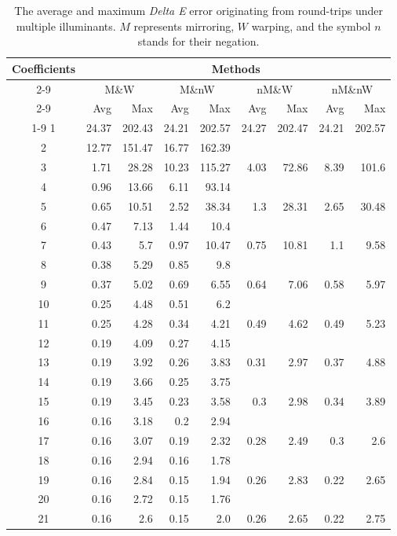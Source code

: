 \begin{table}[t]
	\centering
	\begin{tabular}{crrrrrrrr}
		\toprule
		\multirow{4}{*}{Coefficients} &
		\multicolumn{8}{c}{Methods} \\
		\cmidrule(lr){2-9}
		&\multicolumn{2}{c}{M\&W} &
		\multicolumn{2}{c}{M\&nW} &
		\multicolumn{2}{c}{nM\&W} &
		\multicolumn{2}{c}{nM\&nW}\\
		\cmidrule(lr){2-9}
		& Avg & Max & Avg & Max & Avg & Max & Avg & Max \\
		\cmidrule(lr){1-9}
		1&24.37&202.43&24.21&202.57&24.27&202.47&24.21&202.57\\
		2&12.77&151.47&16.77&162.39&\textemdash&\textemdash&\textemdash&\textemdash\\
		3&1.71&28.28&10.23&115.27&4.03&72.86&8.39&101.6\\
		4&0.96&13.66&6.11&93.14&\textemdash&\textemdash&\textemdash&\textemdash\\
		5&0.65&10.51&2.52&38.34&1.3&28.31&2.65&30.48\\
		6&0.47&7.13&1.44&10.4&\textemdash&\textemdash&\textemdash&\textemdash\\
		7&0.43&5.7&0.97&10.47&0.75&10.81&1.1&9.58\\
		8&0.38&5.29&0.85&9.8&\textemdash&\textemdash&\textemdash&\textemdash\\
		9&0.37&5.02&0.69&6.55&0.64&7.06&0.58&5.97\\ 
		10&0.25&4.48&0.51&6.2&\textemdash&\textemdash&\textemdash&\textemdash\\
		11&0.25&4.28&0.34&4.21&0.49&4.62&0.49&5.23\\
		12&0.19&4.09&0.27&4.15&\textemdash&\textemdash&\textemdash&\textemdash\\
		13&0.19&3.92&0.26&3.83&0.31&2.97&0.37&4.88\\
		14&0.19&3.66&0.25&3.75&\textemdash&\textemdash&\textemdash&\textemdash\\
		15&0.19&3.45&0.23&3.58&0.3&2.98&0.34&3.89\\
		16&0.16&3.18&0.2&2.94&\textemdash&\textemdash&\textemdash&\textemdash\\
		17&0.16&3.07&0.19&2.32&0.28&2.49&0.3&2.6\\
		18&0.16&2.94&0.16&1.78&\textemdash&\textemdash&\textemdash&\textemdash\\
		19&0.16&2.84&0.15&1.94&0.26&2.83&0.22&2.65\\
		20&0.16&2.72&0.15&1.76&\textemdash&\textemdash&\textemdash&\textemdash\\
		21&0.16&2.6&0.15&2.0&0.26&2.65&0.22&2.75\\
		\bottomrule
	\end{tabular}
	\caption{The average and maximum \emph{Delta E} error originating from round-trips under multiple illuminants. $M$ represents mirroring, $W$ warping, and the symbol $n$ stands for their negation.}
	\label{table:comparisonMomentTechnique}
\end{table}

